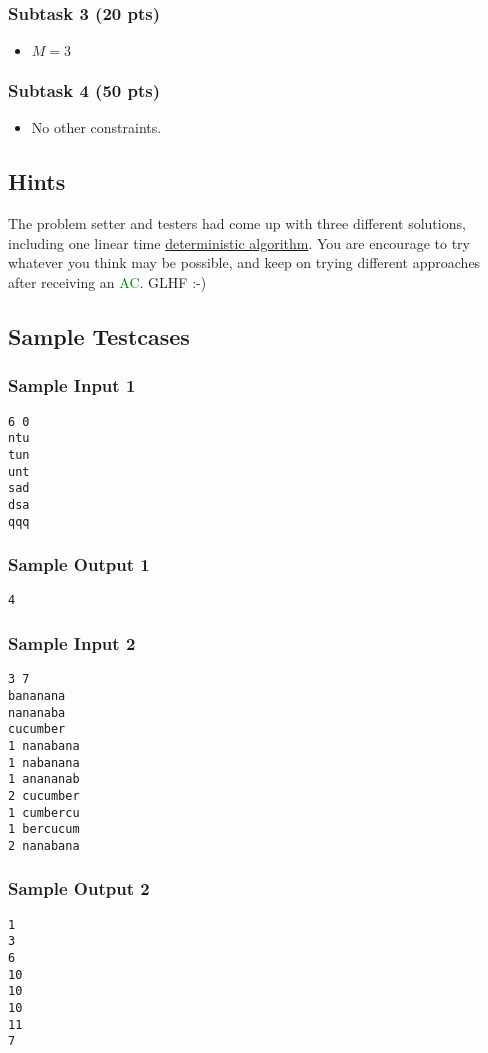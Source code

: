 \subsubsection{Subtask 3 (20 pts)}\label{subtask-3}

\begin{itemize}
\tightlist
\item $M = 3$
\end{itemize}

\subsubsection{Subtask 4 (50 pts)}\label{subtask-3}

\begin{itemize}
\tightlist
\item No other constraints.
\end{itemize}

\subsection{Hints}

The problem setter and testers had come up with three different solutions, including one linear time \href{https://en.wikipedia.org/wiki/Deterministic_algorithm}{deterministic algorithm}. You are encourage to try whatever you think may be possible, and keep on trying different approaches after receiving an \textcolor{green}{AC}. GLHF :-)


\newpage

\subsection{Sample Testcases}

\subsubsection{Sample Input 1}\label{sample-input-1}
\begin{verbatim}
6 0
ntu
tun
unt
sad
dsa
qqq
\end{verbatim}

\subsubsection{Sample Output 1}\label{sample-output-1}
\begin{verbatim}
4
\end{verbatim}

\subsubsection{Sample Input 2}\label{sample-input-2}
\begin{verbatim}
3 7
bananana
nananaba
cucumber
1 nanabana
1 nabanana
1 anananab
2 cucumber
1 cumbercu
1 bercucum
2 nanabana
\end{verbatim}

\subsubsection{Sample Output 2}\label{sample-output-2}
\begin{verbatim}
1
3
6
10
10
10
11
7
\end{verbatim}